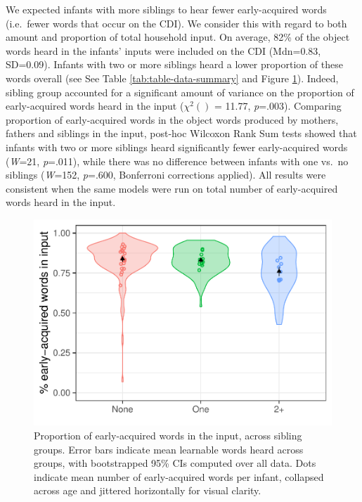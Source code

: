 \documentclass[
  english,
  man,floatsintext]{apa6}
\begin{document}
We expected infants with more siblings to hear fewer early-acquired words (i.e.~fewer words that occur on the CDI). We consider this with regard to both amount and proportion of total household input. On average, 82\% of the object words heard in the infants' inputs were included on the CDI (Mdn=0.83, SD=0.09). Infants with two or more siblings heard a lower proportion of these words overall (see See Table \ref{tab:table-data-summary} and Figure \ref{fig:Figure-in-cdi}). Indeed, sibling group accounted for a significant amount of variance on the proportion of early-acquired words heard in the input (\(\chi^2 ()\) = 11.77, \emph{p}=.003). Comparing proportion of early-acquired words in the object words produced by mothers, fathers and siblings in the input, post-hoc Wilcoxon Rank Sum tests showed that infants with two or more siblings heard significantly fewer early-acquired words (\emph{W}=21, \emph{p}=.011), while there was no difference between infants with one vs.~no siblings (\emph{W}=152, \emph{p}=.600, Bonferroni corrections applied). All results were consistent when the same models were run on total number of early-acquired words heard in the input.

\begin{figure}
\centering
\includegraphics{SiblingsStudyText_files/figure-latex/Figure-in-cdi-1.pdf}
\caption{\label{fig:Figure-in-cdi}Proportion of early-acquired words in the input, across sibling groups. Error bars indicate mean learnable words heard across groups, with bootstrapped 95\% CIs computed over all data. Dots indicate mean number of early-acquired words per infant, collapsed across age and jittered horizontally for visual clarity.}
\end{figure}
\end{document}

